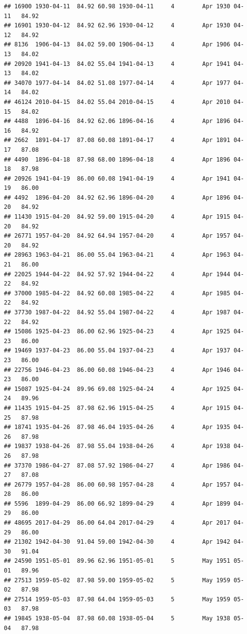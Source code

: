 \documentclass{article}\usepackage[]{graphicx}\usepackage[]{color}
\makeatletter
\newenvironment{kframe}{%
 \def\at@end@of@kframe{}%
 \ifinner\ifhmode%
  \def\at@end@of@kframe{\end{minipage}}%
  \begin{minipage}{\columnwidth}%
 \fi\fi%
 \def\FrameCommand##1{\hskip\@totalleftmargin \hskip-\fboxsep
 \colorbox{shadecolor}{##1}\hskip-\fboxsep
     \hskip-\linewidth \hskip-\@totalleftmargin \hskip\columnwidth}%
 \MakeFramed {\advance\hsize-\width
   \@totalleftmargin\z@ \linewidth\hsize
   \@setminipage}}%
 {\par\unskip\endMakeFramed%
 \at@end@of@kframe}
\newenvironment{knitrout}{}{} %
\makeatother
\begin{document}
\begin{knitrout}
\begin{kframe}
\begin{verbatim}
## 16900 1930-04-11  84.92 60.98 1930-04-11     4        Apr 1930 04-11   84.92
## 16901 1930-04-12  84.92 62.96 1930-04-12     4        Apr 1930 04-12   84.92
## 8136  1906-04-13  84.02 59.00 1906-04-13     4        Apr 1906 04-13   84.02
## 20920 1941-04-13  84.02 55.04 1941-04-13     4        Apr 1941 04-13   84.02
## 34070 1977-04-14  84.02 51.08 1977-04-14     4        Apr 1977 04-14   84.02
## 46124 2010-04-15  84.02 55.04 2010-04-15     4        Apr 2010 04-15   84.02
## 4488  1896-04-16  84.92 62.06 1896-04-16     4        Apr 1896 04-16   84.92
## 2662  1891-04-17  87.08 60.08 1891-04-17     4        Apr 1891 04-17   87.08
## 4490  1896-04-18  87.98 68.00 1896-04-18     4        Apr 1896 04-18   87.98
## 20926 1941-04-19  86.00 60.08 1941-04-19     4        Apr 1941 04-19   86.00
## 4492  1896-04-20  84.92 62.96 1896-04-20     4        Apr 1896 04-20   84.92
## 11430 1915-04-20  84.92 59.00 1915-04-20     4        Apr 1915 04-20   84.92
## 26771 1957-04-20  84.92 64.94 1957-04-20     4        Apr 1957 04-20   84.92
## 28963 1963-04-21  86.00 55.04 1963-04-21     4        Apr 1963 04-21   86.00
## 22025 1944-04-22  84.92 57.92 1944-04-22     4        Apr 1944 04-22   84.92
## 37000 1985-04-22  84.92 60.08 1985-04-22     4        Apr 1985 04-22   84.92
## 37730 1987-04-22  84.92 55.04 1987-04-22     4        Apr 1987 04-22   84.92
## 15086 1925-04-23  86.00 62.96 1925-04-23     4        Apr 1925 04-23   86.00
## 19469 1937-04-23  86.00 55.04 1937-04-23     4        Apr 1937 04-23   86.00
## 22756 1946-04-23  86.00 60.08 1946-04-23     4        Apr 1946 04-23   86.00
## 15087 1925-04-24  89.96 69.08 1925-04-24     4        Apr 1925 04-24   89.96
## 11435 1915-04-25  87.98 62.96 1915-04-25     4        Apr 1915 04-25   87.98
## 18741 1935-04-26  87.98 46.04 1935-04-26     4        Apr 1935 04-26   87.98
## 19837 1938-04-26  87.98 55.04 1938-04-26     4        Apr 1938 04-26   87.98
## 37370 1986-04-27  87.08 57.92 1986-04-27     4        Apr 1986 04-27   87.08
## 26779 1957-04-28  86.00 60.98 1957-04-28     4        Apr 1957 04-28   86.00
## 5596  1899-04-29  86.00 66.92 1899-04-29     4        Apr 1899 04-29   86.00
## 48695 2017-04-29  86.00 64.04 2017-04-29     4        Apr 2017 04-29   86.00
## 21302 1942-04-30  91.04 59.00 1942-04-30     4        Apr 1942 04-30   91.04
## 24590 1951-05-01  89.96 62.96 1951-05-01     5        May 1951 05-01   89.96
## 27513 1959-05-02  87.98 59.00 1959-05-02     5        May 1959 05-02   87.98
## 27514 1959-05-03  87.98 64.04 1959-05-03     5        May 1959 05-03   87.98
## 19845 1938-05-04  87.98 60.08 1938-05-04     5        May 1938 05-04   87.98

\end{verbatim}
\end{kframe}
\end{knitrout}
\end{document}
